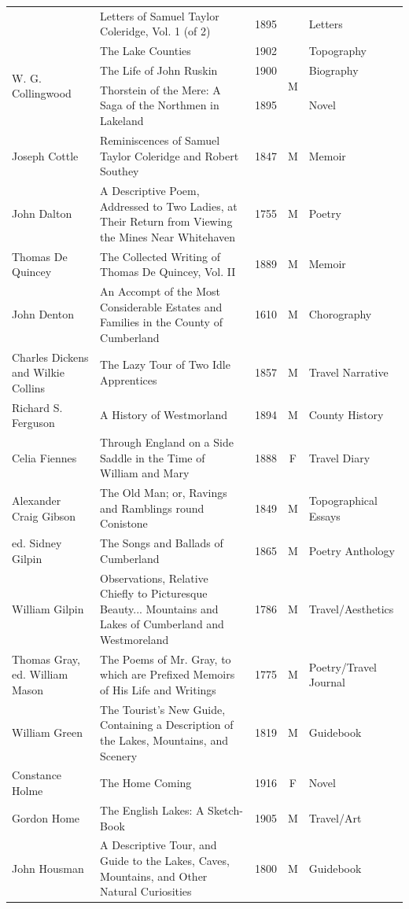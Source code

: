\begin{longtable}{@{}p{3.2cm} p{5.0cm} c c p{3.2cm}@{}}
 & Letters of Samuel Taylor Coleridge, Vol. 1 (of 2) & 1895 &  & Letters \\
\multirow[t]{3}{3.2cm}{W. G. Collingwood} & The Lake Counties & 1902 & \multirow[t]{3}{*}{M} & Topography \\
 & The Life of John Ruskin & 1900 &  & Biography \\
 & Thorstein of the Mere: A Saga of the Northmen in Lakeland & 1895 &  & Novel \\
Joseph Cottle & Reminiscences of Samuel Taylor Coleridge and Robert Southey & 1847 & M & Memoir \\
John Dalton & A Descriptive Poem, Addressed to Two Ladies, at Their Return from Viewing the Mines Near Whitehaven & 1755 & M & Poetry \\
Thomas De Quincey & The Collected Writing of Thomas De Quincey, Vol. II & 1889 & M & Memoir \\
John Denton & An Accompt of the Most Considerable Estates and Families in the County of Cumberland & 1610 & M & Chorography \\
Charles Dickens and Wilkie Collins & The Lazy Tour of Two Idle Apprentices & 1857 & M & Travel Narrative \\
Richard S. Ferguson & A History of Westmorland & 1894 & M & County History \\
Celia Fiennes & Through England on a Side Saddle in the Time of William and Mary & 1888 & F & Travel Diary \\
Alexander Craig Gibson & The Old Man; or, Ravings and Ramblings round Conistone & 1849 & M & Topographical Essays \\
ed. Sidney Gilpin & The Songs and Ballads of Cumberland & 1865 & M & Poetry Anthology \\
William Gilpin & Observations, Relative Chiefly to Picturesque Beauty... Mountains and Lakes of Cumberland and Westmoreland & 1786 & M & Travel/Aesthetics \\
Thomas Gray, ed. William Mason & The Poems of Mr. Gray, to which are Prefixed Memoirs of His Life and Writings & 1775 & M & Poetry/Travel Journal \\
William Green & The Tourist's New Guide, Containing a Description of the Lakes, Mountains, and Scenery & 1819 & M & Guidebook \\
Constance Holme & The Home Coming & 1916 & F & Novel \\
Gordon Home & The English Lakes: A Sketch-Book & 1905 & M & Travel/Art \\
John Housman & A Descriptive Tour, and Guide to the Lakes, Caves, Mountains, and Other Natural Curiosities & 1800 & M & Guidebook \\

\end{longtable}

